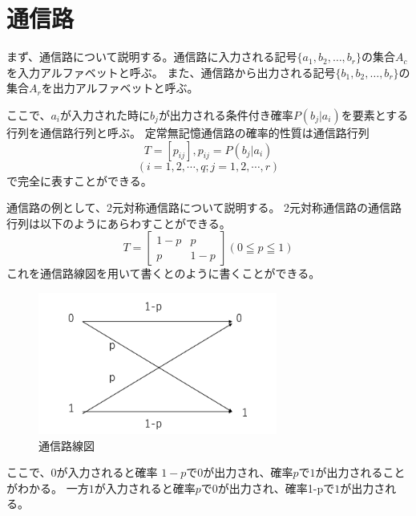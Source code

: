 \chapter{通信路}
まず、通信路について説明する。通信路に入力される記号$\{a_1,b_2,…,b_r\}$の集合$A_c$を入力アルファベットと呼ぶ。
また、通信路から出力される記号$\{b_1,b_2,…,b_r\}$の集合$A_r$を出力アルファベットと呼ぶ。

ここで、$a_i$が入力された時に$b_j$が出力される条件付き確率$P(b_j|a_i)$を要素とする行列を通信路行列と呼ぶ。
定常無記憶通信路の確率的性質は通信路行列
$$T=[p_{ij}],p_{ij}=P(b_j|a_i)$$ $$(i=1,2,\cdots ,q;j=1,2,\cdots,r)$$
で完全に表すことができる。



 通信路の例として、2元対称通信路について説明する。
2元対称通信路の通信路行列は以下のようにあらわすことができる。
$$
T=\begin{bmatrix}
1-p&p\\
p&1-p
\end{bmatrix}
(0≦p≦1)$$ 
これを通信路線図を用いて書くとのように書くことができる。

    \begin{figure}[H]
        \centering   
        \includegraphics[width=0.7\textwidth]{img/Fig1.png}
        \caption[sample image (png)]{通信路線図}
        \label{Fig2_1}
    \end{figure}


ここで、$0$が入力されると確率 $1-p$で$0$が出力され、確率$p$で$1$が出力されることがわかる。
一方$1$が入力されると確率$p$で$0$が出力され、確率1-pで$1$が出力される。


